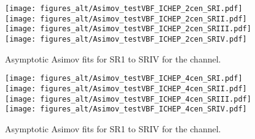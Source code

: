 \begin{figure}[htbp]
  \centering
 \texttt{[image: figures\_alt/Asimov\_testVBF\_ICHEP\_2cen\_SRI.pdf]}
 \texttt{[image: figures\_alt/Asimov\_testVBF\_ICHEP\_2cen\_SRII.pdf]}
 \texttt{[image: figures\_alt/Asimov\_testVBF\_ICHEP\_2cen\_SRIII.pdf]}
 \texttt{[image: figures\_alt/Asimov\_testVBF\_ICHEP\_2cen\_SRIV.pdf]}\\
\caption{Asymptotic Asimov fits for SR1 to SRIV for the \twocentral channel.}
  \label{fig:2cenAsimov}
\end{figure}

\begin{figure}[htbp]
  \centering
 \texttt{[image: figures\_alt/Asimov\_testVBF\_ICHEP\_4cen\_SRI.pdf]}
 \texttt{[image: figures\_alt/Asimov\_testVBF\_ICHEP\_4cen\_SRII.pdf]}
 \texttt{[image: figures\_alt/Asimov\_testVBF\_ICHEP\_4cen\_SRIII.pdf]}
 \texttt{[image: figures\_alt/Asimov\_testVBF\_ICHEP\_4cen\_SRIV.pdf]}\\

\caption{Asymptotic Asimov fits for SR1 to SRIV for the \fourcentral channel.}
  \label{fig:4cenAsimov}
\end{figure}




